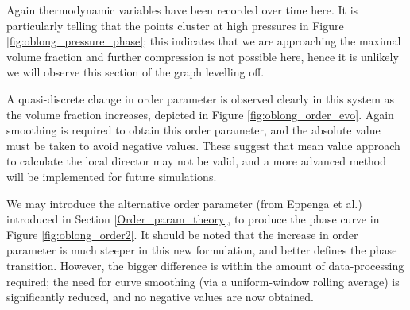 \documentclass[11pt, a4paper]{article} %
\begin{document}
Again thermodynamic variables have been recorded over time here. It is particularly telling that the points cluster at high pressures in Figure \ref{fig:oblong_pressure_phase}; this indicates that we are approaching the maximal volume fraction and further compression is not possible here, hence it is unlikely we will observe this section of the graph levelling off.

A quasi-discrete change in order parameter is observed clearly in this system as the volume fraction increases, depicted in Figure \ref{fig:oblong_order_evo}. Again smoothing is required to obtain this order parameter, and the absolute value must be taken to avoid negative values. These suggest that mean value approach to calculate the local director may not be valid, and a more advanced method will be implemented for future simulations.

We may introduce the alternative order parameter (from Eppenga et al.) introduced in Section \ref{Order_param_theory}, to produce the phase curve in Figure \ref{fig:oblong_order2}. It should be noted that the increase in order parameter is much steeper in this new formulation, and better defines the phase transition. However, the bigger difference is within the amount of data-processing required; the need for curve smoothing (via a uniform-window rolling average) is significantly reduced, and no negative values are now obtained.
\end{document}
